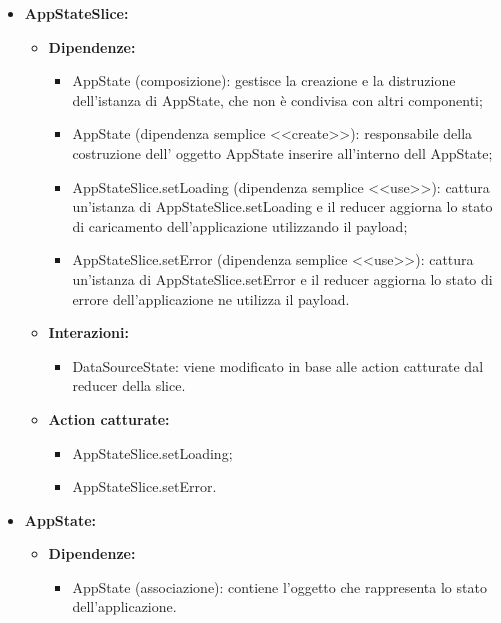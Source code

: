 \begin{itemize}
    \item \textbf{AppStateSlice:}
    \begin{itemize}
        \item \textbf{Dipendenze:}
        \begin{itemize}
            \item AppState (composizione): gestisce la creazione e la distruzione dell'istanza di AppState, che non è condivisa con altri componenti;
            \item AppState (dipendenza semplice <<create>>): responsabile della costruzione dell' oggetto AppState inserire all’interno dell AppState;
            \item AppStateSlice.setLoading (dipendenza semplice <<use>>): cattura un’istanza di AppStateSlice.setLoading e il reducer aggiorna lo stato di caricamento dell'applicazione utilizzando il payload;
            \item AppStateSlice.setError (dipendenza semplice <<use>>): cattura un’istanza di AppStateSlice.setError e il reducer aggiorna lo stato di errore dell'applicazione ne utilizza il payload.
        \end{itemize} 
        \item \textbf{Interazioni:}
        \begin{itemize}
            \item DataSourceState: viene modificato in base alle action catturate dal reducer della slice.
        \end{itemize} 
        \item \textbf{Action catturate:}
        \begin{itemize}
            \item AppStateSlice.setLoading;
            \item AppStateSlice.setError.
        \end{itemize} 
    \end{itemize}

    
    \item \textbf{AppState:}
    \begin{itemize}
        \item \textbf{Dipendenze:}
        \begin{itemize}
            \item AppState (associazione): contiene l'oggetto che rappresenta lo stato dell'applicazione.
        \end{itemize} 
    \end{itemize}


\end{itemize}
